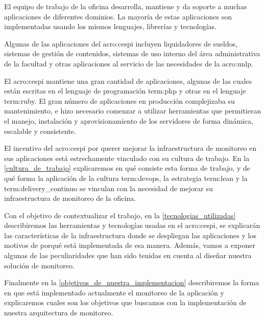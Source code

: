 El equipo de trabajo de la oficina desarrolla, mantiene y da soporte a muchas
aplicaciones de diferentes dominios. La mayoría de estas aplicaciones son
implementadas usando los mismos lenguajes, librerías y tecnologías.

Algunas de las aplicaciones del \gls{acro:cespi} incluyen liquidadores de sueldos,
sistemas de gestión de contenidos, sistemas de uso interno del área
administrativa de la facultad y otras aplicaciones al servicio de las
necesidades de la \gls{acro:unlp}.

El \gls{acro:cespi} mantiene una gran cantidad de aplicaciones, algunas de las
cuales están escritas en el lenguaje de programación \gls{term:php} y otras en
el lenguaje \gls{term:ruby}. El gran número de aplicaciones en producción
complejizaba su mantenimiento, e hizo necesario comenzar a utilizar
herramientas que permitieran el manejo, instalación y aprovisionamiento de los
servidores de forma dinámica, escalable y consistente.

El incentivo del \gls{acro:cespi} por querer mejorar la infraestructura de monitoreo
en sus aplicaciones está estrechamente vinculado con su cultura de trabajo. En
la \autoref{cultura_de_trabajo} explicaremos en qué consiste esta forma de
trabajo, y de qué forma la aplicación de la cultura \gls{term:devops}, la
estrategia \gls{term:lean} y la \gls{term:delivery_continuo} se vinculan con la
necesidad de mejorar su infraestructura de monitoreo de la oficina.

Con el objetivo de contextualizar el trabajo, en la
\autoref{tecnologias_utilizadas} describiremos las herramientas y tecnologías
usadas en el \gls{acro:cespi}, se explicarán las características de la
infraestructura donde se despliegan las aplicaciones y los motivos de porqué
está implementada de esa manera. Además, vamos a exponer algunas de las
peculiaridades que han sido tenidas en cuenta al diseñar nuestra solución de
monitoreo.

Finalmente en la \autoref{objetivos_de_nuestra_implementacion} describiremos la
forma en que está implementado actualmente el monitoreo de la aplicación y
explicaremos cuales son los objetivos que buscamos con la implementación de
nuestra arquitectura de monitoreo.
